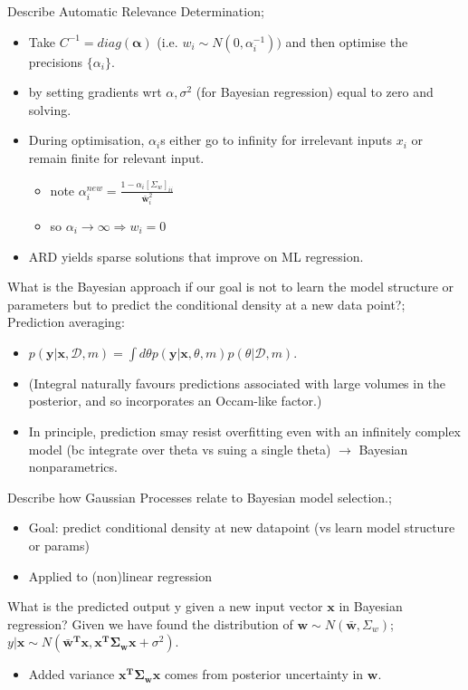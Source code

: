 \documentclass{article}
\begin{document}
Describe Automatic Relevance Determination; \begin{itemize} \item Take $C^{-1}=diag(\mathbf{\alpha})$ (i.e. $w_i\sim N(0, \alpha_i^{-1}))$ and then optimise the precisions $\{\alpha_i\}$.  \item by setting gradients wrt $\alpha, \sigma^2$ (for Bayesian regression) equal to zero and solving.  \item During optimisation, $\alpha_i$s either go to infinity for irrelevant inputs $x_i$ or remain finite for relevant input.  \begin{itemize} \item note $\alpha_i^{new}=\frac{1-\alpha_i[\Sigma_w]_{ii}}{\mathbf{\bar{w}}^2_i}$ \item so $\alpha_i\rightarrow\infty\Rightarrow w_i = 0$ \end{itemize} \item ARD yields sparse solutions that improve on ML regression.  \end{itemize}


What is the Bayesian approach if our goal is not to learn the model structure or parameters but to predict the conditional density at a new data point?; Prediction averaging: \begin{itemize} \item  $p(\mathbf{y|x}, \mathcal{D}, m)=\int d\theta p(\mathbf{y|x}, \theta, m)p(\theta|\mathcal{D}, m)$.  \item (Integral naturally favours predictions associated with  large volumes in the posterior, and so incorporates an Occam-like factor.) \item In principle, prediction smay resist overfitting even with an infinitely complex model (bc integrate over theta vs suing a single theta) $\rightarrow$ Bayesian nonparametrics.  \end{itemize} 

Describe how Gaussian Processes relate to Bayesian model selection.; \begin{itemize} \item Goal: predict conditional density at new datapoint (vs learn model structure or params) \item Applied to (non)linear regression \end{itemize}

What is the predicted output y given a new input vector $\mathbf{x}$ in Bayesian regression? Given we have found the distribution of $\mathbf{w}\sim N(\mathbf{\bar{w}}, \Sigma_w)$; $y|\mathbf{x}\sim N(\mathbf{\bar{w}^Tx}, \mathbf{x^T\Sigma_w x}+\sigma^2)$. \begin{itemize} \item Added variance $\mathbf{x^T\Sigma_w x}$ comes from posterior uncertainty in $\mathbf{w}$.  \end{itemize}
\end{document}
